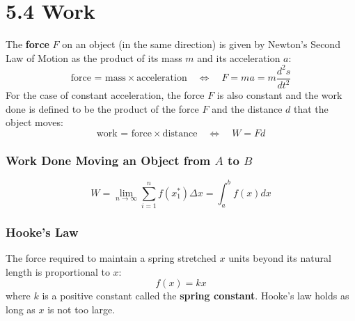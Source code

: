 %
%

\section*{5.4 Work}

The \textbf{force} \(F\) on an object (in the same direction) is given by Newton's Second Law of Motion as the product of its mass \(m\) and its acceleration \(a\):
\[ \text{force = mass} \times \text{acceleration} \quad \Leftrightarrow \quad F = ma = m \frac{d^2s}{dt^2} \]
For the case of constant acceleration, the force \(F\) is also constant and the work done is defined to be the product of the force \(F\) and the distance \(d\) that the object moves:
\[ \text{work = force} \times \text{distance} \quad \Leftrightarrow \quad W = Fd \]

\subsubsection*{Work Done Moving an Object from \(A\) to \(B\)}

\[ W = \lim_{n \to \infty} \sum_{i=1}^n f(x_1^*) \Delta x = \int_a^b f(x)dx \]

\subsubsection*{Hooke's Law}

The force required to maintain a spring stretched \(x\) units beyond its natural length is proportional to \(x\):
\[f(x)=kx\]
where \(k\) is a positive constant called the \textbf{spring constant}. Hooke's law holds as long as \(x\) is not too large.
